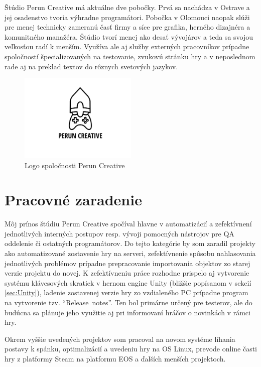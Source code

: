 \documentclass[slovak,bachelorpractice]{diploma}
\begin{document}
Štúdio Perun Creative má aktuálne dve pobočky. Prvá sa nachádza v Ostrave a jej osadenstvo tvoria výhradne programátori. Pobočka v Olomouci naopak slúži pre menej technicky zameranú časť firmy a síce pre grafika, herného dizajnéra a komunitného manažéra. Štúdio tvorí menej ako desať vývojárov a teda sa svojou veľkosťou radí k menším. Využíva ale aj služby externých pracovníkov prípadne spoločností špecializovaných na testovanie, zvukovú stránku hry a v neposlednom rade aj na preklad textov do rôznych svetových jazykov.
\vspace{-20pt}
\begin{figure}[!htbp]
	\centering
	\includegraphics[width=0.5\textwidth]{Pictures/perunLogo.pdf}
	\vspace{-35pt}
	\caption{Logo spoločnosti Perun Creative}
	\label{pic:perunLogo}
\end{figure}
\vspace{-20pt}
\section{Pracovné zaradenie}
\label{sec:Me}
Môj prínos štúdiu Perun Creative spočíval hlavne v automatizácií a zefektívnení jednotlivých interných postupov resp. vývoji pomocných nástrojov pre QA oddelenie či ostatných programátorov. Do tejto kategórie by som zaradil projekty ako automatizované zostavenie hry na serveri, zefektívnenie spôsobu nahlasovania jednotlivých problémov prípadne prepracovanie importovania objektov zo starej verzie projektu do novej. K zefektívneniu práce rozhodne prispelo aj vytvorenie systému klávesových skratiek v hernom engine Unity (bližšie popísanom v sekcií \ref{sec:Unity}), ladenie zostavenej verzie hry zo vzdialeného PC prípadne program na vytvorenie tzv. \mbox{\enquote{Release notes}}. Ten bol primárne určený pre testerov, ale do budúcna sa plánuje jeho využitie aj pri informovaní hráčov o novinkách v rámci hry.

Okrem vyššie uvedených projektov som pracoval na novom systéme líhania postavy k spánku, optimalizácií a uvedeniu hry na OS Linux, prevode online časti hry z platformy Steam na platformu EOS a ďalších menších projektoch.
\end{document}
